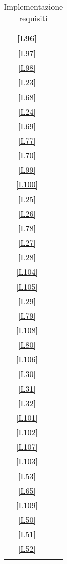 \begin{longtable}{|c|c|}
	\hline \ref{L96} & \si \\
	\hline \ref{L97} & \si \\ %
	\hline \ref{L98} & \si \\
	\hline \ref{L23} & \si \\
	\hline \ref{L68} & \si \\
	\hline \ref{L24} & \si \\
	\hline \ref{L69} & \si \\ %
	\hline \ref{L77} & \si \\
	\hline \ref{L70} & \no \\
	\hline \ref{L99} & \si \\
	\hline \ref{L100} & \no \\
	\hline \ref{L25} & \si \\ %
	\hline \ref{L26} & \si \\
	\hline \ref{L78} & \si \\
	\hline \ref{L27} & \no \\
	\hline \ref{L28} & \no \\
	\hline \ref{L104} & \si \\ %
	\hline \ref{L105} & \si \\
	\hline \ref{L29} & \si \\
	\hline \ref{L79} & \si \\
	\hline \ref{L108} & \si \\
	\hline \ref{L80} & \si \\ %
	\hline \ref{L106} & \si \\
	\hline \ref{L30} & \si \\
	\hline \ref{L31} & \si \\
	\hline \ref{L32} & \si \\  
	\hline \ref{L101} & \si \\%
	\hline \ref{L102} & \no \\ 
	\hline \ref{L107} & \no \\
	\hline \ref{L103} & \no \\
	\hline \ref{L53} & \no \\ 
	\hline \ref{L65} & \no \\ %
	\hline \ref{L109} & \no \\
	\hline \ref{L50} & \no \\
	\hline \ref{L51} & \no \\
	\hline \ref{L52} & \no \\ %
	\hline
	\caption{Implementazione requisiti}
\end{longtable}